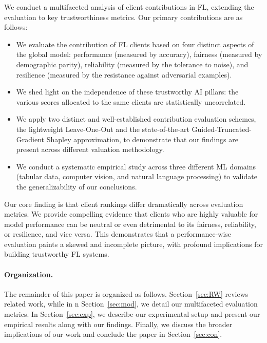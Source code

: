 \documentclass{uai2026}
\begin{document}
We conduct a multifaceted analysis of client contributions in FL, extending the evaluation to key trustworthiness metrics. Our primary contributions are as follows:

\begin{itemize}
    \item We evaluate the contribution of FL clients based on four distinct aspects of the global model: performance (measured by accuracy), fairness (measured by demographic parity), reliability (measured by the tolerance to noise), and resilience (measured by the resistance against adversarial examples).
    \item We shed light on the independence of these trustworthy AI pillars: the various scores allocated to the same clients are statistically uncorrelated.
    \item We apply two distinct and well-established contribution evaluation schemes, the lightweight Leave-One-Out and the state-of-the-art Guided-Truncated-Gradient Shapley approximation, to demonstrate that our findings are present across different valuation methodology.
    \item We conduct a systematic empirical study across three different ML domains (tabular data, computer vision, and natural language processing) to validate the generalizability of our conclusions.
\end{itemize}

Our core finding is that client rankings differ dramatically across evaluation metrics. We provide compelling evidence that clients who are highly valuable for model performance can be neutral or even detrimental to its fairness, reliability, or resilience, and vice versa. This demonstrates that a performance-wise evaluation paints a skewed and incomplete picture, with profound implications for building trustworthy FL systems.

\paragraph{Organization. }

The remainder of this paper is organized as follows. Section~\ref{sec:RW} reviews related work, while in n Section~\ref{sec:mod}, we detail our multifaceted evaluation metrics. In Section~\ref{sec:exp}, we describe our experimental setup and present our empirical results along with our findings. Finally, we discuss the broader implications of our work and conclude the paper in Section~\ref{sec:con}.
\end{document}

